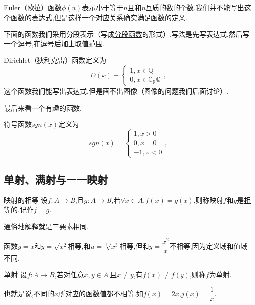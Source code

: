 \documentclass[lang=cn,math=cm,chinesefont=nofont,11pt,scheme=chinese,twocol]{elegantbook}
\begin{document}
\begin{example}
  Euler（欧拉）函数$\phi (n)$表示小于等于$n$且和$n$互质的数的个数.我们并不能写出这个函数的表达式,但是这样一个对应关系确实满足函数的定义.
\end{example}

下面的函数我们采用分段表示（写成\underline{分段函数}的形式）,写法是先写表达式,然后写一个逗号,在逗号后加上取值范围.

\begin{example}
  Dirichlet（狄利克雷）函数定义为
  $$D(x)=
  \begin{cases}
    1,x\in\mathbb{Q}
    \\0,x\in\complement_{\mathbb{R}}\mathbb{Q}
  \end{cases},$$
  这个函数我们能写出表达式,但是画不出图像（图像的问题我们后面讨论）.
\end{example}

最后来看一个有趣的函数.

\begin{example}
  符号函数$sgn(x)$定义为
  $$sgn(x)=
  \begin{cases}
    1,x>0
    \\0,x=0
    \\-1,x<0
  \end{cases},$$
\end{example}

\subsection{单射、满射与一一映射}

\begin{definition}{映射的相等}
  设$f:A\rightarrow B$,且$g:A\rightarrow B$,若$\forall x\in A,f(x)=g(x)$,则称映射$f$和$g$是\underline{相等}的.记作$f=g$.
\end{definition}

通俗地解释就是三要素相同.

\begin{example}
  函数$y=x$和$y=\sqrt{x^2}$相等,和$u=\sqrt[3]{x^3}$相等,但和$y=\dfrac{x^2}{x}$不相等,因为定义域和值域不同.
\end{example}

\begin{definition}{单射}
  设$f:A\rightarrow B$,若对任意$x,y\in A$,且$x\neq y$,有$f(x)\neq f(y)$,则称$f$为\underline{单射}.
\end{definition}

也就是说,不同的$x$所对应的函数值都不相等.如$f(x)=2x$,$g(x)=\dfrac{1}{x}$.
\end{document}
